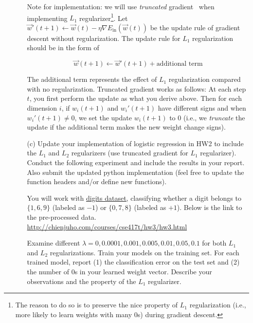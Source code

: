 \documentclass[11pt]{article}
\begin{document}
\begin{enumerate}
\begin{itemize}
    \vspace{5pt}
    Note for implementation: 
    we will use \emph{truncated} gradient~\cite{l1} when implementing $L_1$ regularizer\footnote{The reason to do so is to preserve the nice property of $L_1$ regularization (i.e., more likely to learn weights with many $0$s) during gradient descent.}.
    Let $\vec{w}'(t+1)\leftarrow\vec{w}(t)- \eta\nabla E_{\text{in}}(\vec{w}(t))$ be the update rule of gradient descent without regularization.
    The update rule for $L_1$ regularization should be in the form of 

    \vspace{-18pt}
    \[\vec{w}(t+1)\leftarrow \vec{w}'(t+1) + \text{additional term}\]
    
    \vspace{-5pt}
    The additional term represents the effect of $L_1$ regularization compared with no regularization.
    Truncated gradient works as follows:
    At each step $t$, you first perform the update as what you derive above.
    Then for each dimension $i$, if $w_i(t+1)$ and $w_i'(t+1)$ have different signs and when $w_i'(t+1)\neq 0$, we set the update $w_i(t+1)$ to $0$ (i.e., we \emph{truncate} the update if the additional term makes the new weight change signs).
    
    \vspace{5pt}
    \item[(c)] Update your implementation of logistic regression in HW2 to include the $L_1$ and $L_2$ regularizers (use truncated gradient for $L_1$ regularizer). 
    Conduct the following experiment and include the results in your report.
    Also submit the updated python implementation (feel free to update the function headers and/or define new functions). 

    \vspace{5pt}
    You will work with \href{https://scikit-learn.org/stable/modules/generated/sklearn.datasets.load_digits.html}{\underline{digits dataset}}, classifying 
    whether a digit belongs to $\{1,6,9\}$ (labeled as $-1$) or $\{0,7,8\}$ (labeled as $+1$).
    Below is the link to the pre-processed data.\\
    \url{http://chienjuho.com/courses/cse417t/hw3/hw3.html}

    \vspace{5pt}
    Examine different $\lambda=0, 0.0001, 0.001, 0.005, 0.01, 0.05, 0.1$ for both $L_1$ and $L_2$ regularizations.
    Train your models on the training set. For each trained model,
    report (1) the classification error on the test set and (2) the number of $0$s in your learned weight vector.
    Describe your observations and the property of the $L_1$ regularizer.
    

\end{itemize}
\end{enumerate}
\end{document}
